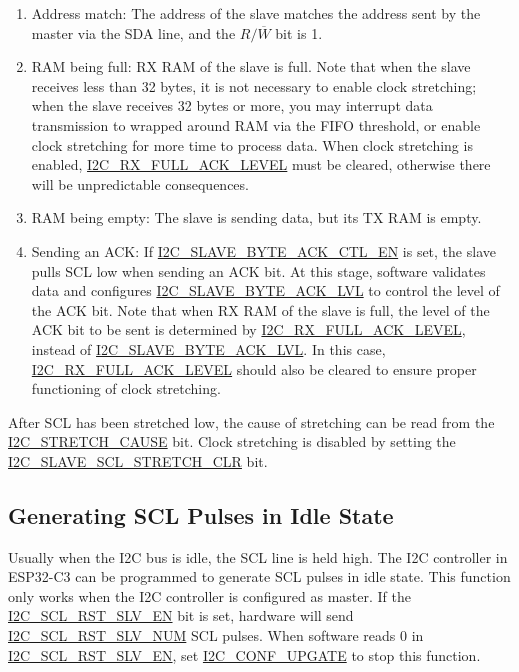 \documentclass[main\_\_EN.tex]{subfiles}
\begin{document}
\begin{enumerate}
\item Address match: The address of the slave matches the address sent by the master via the SDA line, and the $R/\overline W$ bit is 1.
\item RAM being full: RX RAM of the slave is full. Note that when the slave receives less than 32 bytes, it is not necessary to enable clock stretching; when the slave receives 32 bytes or more, you may interrupt data transmission to wrapped around RAM via the FIFO threshold, or enable clock stretching for more time to process data. When clock stretching is enabled, \hyperref[fielddesc:I2CRXFULLACKLEVEL]{I2C\_RX\_FULL\_ACK\_LEVEL} must be cleared, otherwise there will be unpredictable consequences.
\item RAM being empty: The slave is sending data, but its TX RAM is empty.
\item Sending an ACK: If \hyperref[fielddesc:I2CSLAVEBYTEACKCTLEN]{I2C\_SLAVE\_BYTE\_ACK\_CTL\_EN} is set, the slave pulls SCL low when sending an ACK bit. At this stage, software validates data and configures \hyperref[fielddesc:I2CSLAVEBYTEACKLVL]{I2C\_SLAVE\_BYTE\_ACK\_LVL} to control the level of the ACK bit. Note that when RX RAM of the slave is full, the level of the ACK bit to be sent is determined by \hyperref[fielddesc:I2CRXFULLACKLEVEL]{I2C\_RX\_FULL\_ACK\_LEVEL}, instead of \hyperref[fielddesc:I2CSLAVEBYTEACKLVL]{I2C\_SLAVE\_BYTE\_ACK\_LVL}. In this case, \hyperref[fielddesc:I2CRXFULLACKLEVEL]{I2C\_RX\_FULL\_ACK\_LEVEL} should also be cleared to ensure proper functioning of clock stretching.
\end{enumerate}

After SCL has been stretched low, the cause of stretching can be read from the \hyperref[fielddesc:I2CSTRETCHCAUSE]{I2C\_STRETCH\_CAUSE} bit. Clock stretching is disabled by setting the \hyperref[fielddesc:I2CSLAVESCLSTRETCHCLR]{I2C\_SLAVE\_SCL\_STRETCH\_CLR} bit.

\subsection{Generating SCL Pulses in Idle State}
Usually when the I2C bus is idle, the SCL line is held high. The I2C controller in ESP32-C3 can be programmed to generate SCL pulses in idle state. This function only works when the I2C controller is configured as master. If the \hyperref[fielddesc:I2CSCLRSTSLVEN]{I2C\_SCL\_RST\_SLV\_EN} bit is set, hardware will send \hyperref[fielddesc:I2CSCLRSTSLVNUM]{I2C\_SCL\_RST\_SLV\_NUM} SCL pulses. When software reads 0 in  \hyperref[fielddesc:I2CSCLRSTSLVEN]{I2C\_SCL\_RST\_SLV\_EN}, set \hyperref[fielddesc:I2CCONFUPGATE]{I2C\_CONF\_UPGATE} to stop this function.
\end{document}
